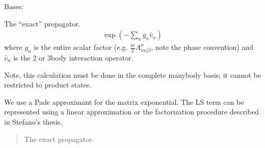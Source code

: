 \documentclass[letterpaper,10pt,english]{sphinxmanual}
\begin{document}

\begin{fulllineitems}
\label{\detokenize{spinbox:spinbox.core.ExactPropagator}}
\pysigstartsignatures
{}
\pysigstopsignatures
\sphinxAtStartPar
Bases: 

\sphinxAtStartPar
The “exact” propagator.
\begin{equation*}
\begin{split}\exp \left( - \sum_n  g_n \hat{v}_n  \right)\end{split}
\end{equation*}
\sphinxAtStartPar
where \(g_n\) is the entire scalar factor (e.g. \(\frac{\delta\tau}{2} A^{\sigma}_{i \alpha j \beta}\), note the phase convention)
and \(\hat{v}_n\)
is the 2\sphinxhyphen{} or 3\sphinxhyphen{}body interaction operator.

\sphinxAtStartPar
Note, this calculation must be done in the complete many\sphinxhyphen{}body basis; it cannot be restricted to product states.

\sphinxAtStartPar
We use a Pade approximant for the matrix exponential. 
The LS term can be represented using a linear approximation or the factorization procedure described in Stefano’s thesis.
\begin{quote}\begin{description}
\sphinxAtStartPar
The exact propagator.

\sphinxAtStartPar
{\hyperref[\detokenize{spinbox:spinbox.core.HilbertOperator}]{}}

\end{description}\end{quote}

\begin{fulllineitems}
\label{\detokenize{spinbox:spinbox.core.ExactPropagator.force_coulomb}}
\pysigstartsignatures
{}
\pysigstopsignatures
\end{fulllineitems}


\end{fulllineitems}
\end{document}
